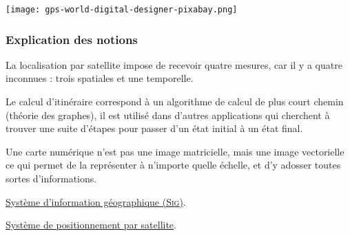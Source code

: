 \vspace{4pt}
\begin{fullwidth}
\Centering
\texttt{[image: gps-world-digital-designer-pixabay.png]}
\end{fullwidth}


\subsubsection[Explication des notions]{Explication des notions}
\label{subsub:VIII.4.1.3}


\begin{jazzitemize}
\item La localisation par satellite impose de recevoir quatre mesures,  car il y a quatre inconnues : trois spatiales et une temporelle.
\item Le calcul d'itinéraire correspond à un algorithme de calcul de plus court chemin (théorie des graphes), il est utilisé dans d'autres applications qui cherchent à trouver une suite d'étapes pour passer d'un état initial à un état final.
\item Une carte numérique n'est pas une image matricielle, mais une image vectorielle ce qui permet de la représenter à n'importe quelle échelle, et d'y adosser toutes sortes d'informations.
\end{jazzitemize}


\begin{jazzitemize}
\item \href{https://fr.wikipedia.org/wiki/Programmation_\%C3\%A9v\%C3\%A9nementielle}{Système d'information géographique (\textsc{Sig})}.
\item \href{https://fr.wikipedia.org/wiki/Internet_des_objets}{Système de positionnement par satellite}.
\end{jazzitemize}

\vfill



